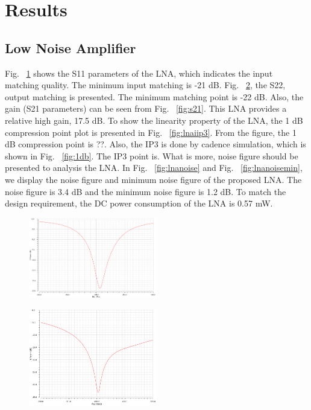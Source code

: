 \section{Results}
\subsection{Low Noise Amplifier}
Fig. ~\ref{fig:s11} shows the S11 parameters of the LNA, which indicates the input matching quality. The minimum input matching is -21 dB. Fig. ~\ref{fig:s22}, the S22, output matching is presented. The minimum matching point is -22 dB. Also, the gain (S21 parameters) can be seen from Fig. ~\ref{fig:s21}. This LNA provides a relative high gain, 17.5 dB. To show the linearity property of the LNA, the 1 dB compression point plot is presented in Fig. ~\ref{fig:lnaiip3}. From the figure, the 1 dB compression point is ??. Also, the IP3 is done by cadence simulation, which is shown in Fig. ~\ref{fig:1db}. The IP3 point is. What is more, noise figure should be presented to analysis the LNA. In Fig. ~\ref{fig:lnanoise} and Fig. ~\ref{fig:lnanoisemin}, we display the noise figure and minimum noise figure of the proposed LNA. The noise figure is 3.4 dB and the minimum noise figure is 1.2 dB. To match the design requirement, the DC power consumption of the LNA is 0.57 mW. 

\begin{figure}[h]
   \centering
    \includegraphics[width=0.5\textwidth]{figures/s11.png}
    \caption{}
    \label{fig:s11}
\end{figure}

\begin{figure}[h]
   \centering
    \includegraphics[width=0.5\textwidth]{figures/s22.png}
    \caption{}
    \label{fig:s22}
\end{figure}

